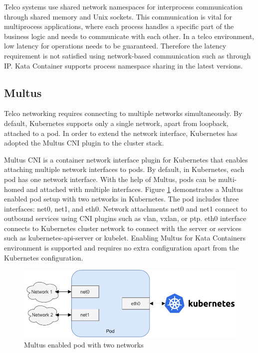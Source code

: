 Telco systems use shared network namespaces for interprocess communication through shared memory and Unix sockets. This communication is vital for multiprocess applications, where each process handles a specific part of the business logic and needs to communicate with each other. In a telco environment, low latency for operations needs to be guaranteed. Therefore the latency requirement is not satisfied using network-based communication such as through IP. Kata Container supports process namespace sharing in the latest versions.

\subsection{Multus}

Telco networking requires connecting to multiple networks simultaneously. By default, Kubernetes supports only a single network, apart from loopback, attached to a pod. In order to extend the network interface, Kubernetes has adopted the Multus CNI plugin to the cluster stack.

Multus CNI \cite{Multus} is a container network interface plugin for Kubernetes that enables attaching multiple network interfaces to pods. By default, in Kubernetes, each pod has one network interface. With the help of Multus, pods can be multi-homed and attached with multiple interfaces. Figure \ref{fig:Multus} demonstrates a Multus enabled pod setup with two networks in Kubernetes. The pod includes three interfaces: net0, net1, and eth0. Network attachments net0 and net1 connect to outbound services using CNI plugins such as vlan, vxlan, or ptp. eth0 interface connects to Kubernetes cluster network to connect with the server or services such as kubernetes-api-server or kubelet. Enabling Multus for Kata Containers environment is supported and requires no extra configuration apart from the Kubernetes configuration. \cite{MultusUbuntu}

\begin{figure}[ht]
  \begin{center}
    \includegraphics[width=13.5cm]{images/Multus.pdf}
    \caption{Multus enabled pod with two networks}
    \label{fig:Multus}
  \end{center}
\end{figure}

